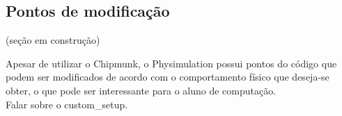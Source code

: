 \subsection{Pontos de modificação}

(seção em construção)

Apesar de utilizar o Chipmunk, o Physimulation possui pontos do código que podem ser modificados de acordo com o comportamento físico que deseja-se obter, o que pode ser interessante para o aluno de computação. \\

Falar sobre o custom\_setup. \\


